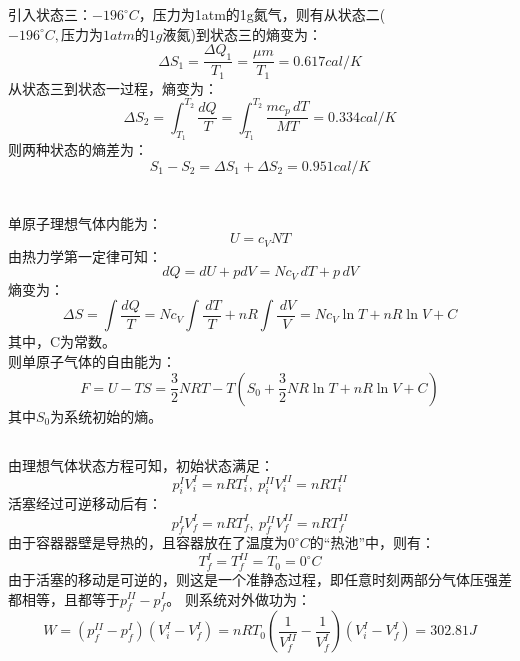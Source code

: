 \documentclass[a4paper,12pt]{article}
\begin{document}
\section{}
引入状态三：$-196^{\circ}C$，压力为1atm的1g氮气，则有从状态二($-196^{\circ}C,压力为1atm的1g液氮$)到状态三的熵变为：
\begin{equation}\nonumber
	\Delta S_1=\frac{\Delta Q_1}{T_1}=\frac{\mu m}{T_1}=0.617 cal/K
\end{equation}
从状态三到状态一过程，熵变为：
\begin{equation}\nonumber
	\Delta S_2=\int_{T_1}^{T_2}\frac{dQ}{T}=\int_{T_1}^{T_2}\frac{mc_p\,dT}{MT}=0.334 cal/K
\end{equation}
则两种状态的熵差为：
\begin{equation}\nonumber
	S_1-S_2=\Delta S_1+\Delta S_2=0.951 cal/K
\end{equation}

\section{}
\subsection{}
单原子理想气体内能为：
\begin{equation}\nonumber
	U=c_VNT
\end{equation}
由热力学第一定律可知：
\begin{equation}\nonumber
	dQ=dU+pdV=Nc_V\,dT+p\,dV
\end{equation}
熵变为：
\begin{equation}\nonumber
	\Delta S=\int\frac{dQ}{T}=Nc_V\int\frac{\,dT}{T}+nR\int\frac{\,dV}{V}=Nc_V\ln T+nR\ln V +C
\end{equation}
其中，C为常数。\\
则单原子气体的自由能为：
\begin{equation}\nonumber
	F=U-TS=\frac{3}{2}NRT-T\left(S_0+\frac{3}{2}NR\ln T+nR\ln V +C\right)
\end{equation}
其中$S_0$为系统初始的熵。
\subsection{}
由理想气体状态方程可知，初始状态满足：
\begin{equation}\nonumber
	p_i^{I}V_i^{I}=nRT_i^{I},~p_i^{II}V_i^{II}=nRT_i^{II}
\end{equation}
活塞经过可逆移动后有：
\begin{equation}\nonumber
	p_f^{I}V_f^{I}=nRT_f^{I},~p_f^{II}V_f^{II}=nRT_f^{II}
\end{equation}
由于容器器壁是导热的，且容器放在了温度为$0^{\circ}C$的“热池”中，则有：
\begin{equation}\nonumber
	T_f^{I}=T_f^{II}=T_0=0^{\circ}C
\end{equation}
由于活塞的移动是可逆的，则这是一个准静态过程，即任意时刻两部分气体压强差都相等，且都等于$p_f^{II}-p_f^{I}$。
则系统对外做功为：
\begin{equation}\nonumber
	W=\left(p_f^{II}-p_f^{I}\right)\left(V_i^I-V_f^I\right)=nRT_0\left(\frac{1}{V_f^{II}}-\frac{1}{V_f^{I}}\right)\left(V_i^I-V_f^I\right)=302.81J
\end{equation}
\end{document}
